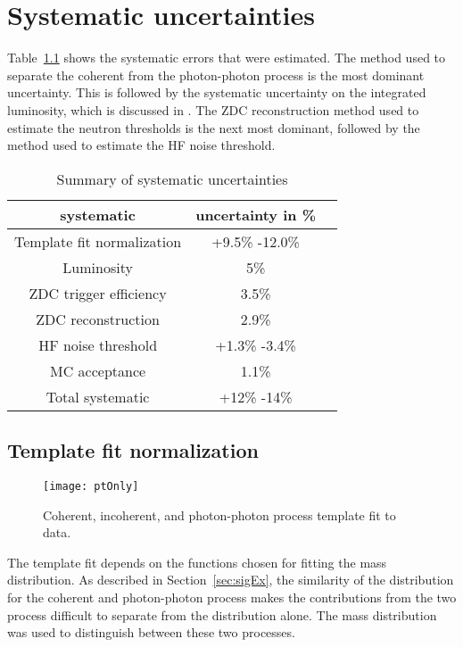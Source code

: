 \chapter{\label{sec:sysCheck}Systematic uncertainties}
  
  Table~\ref{tab:sumsyst} shows the systematic errors that were estimated.
  The method used to separate the coherent from the photon-photon process 
   is the most dominant uncertainty.
  This is followed by the systematic uncertainty on the integrated luminosity,
    which is discussed in \cite{cmsLumi}.
  The ZDC reconstruction method used to estimate the neutron thresholds 
    is the next most dominant, followed by the method used to estimate
    the HF noise threshold. 
  \begin{table}[!Hhtb]
    \begin{center}
      \begin{tabular}{|c|c|c|}
        \hline
        systematic & uncertainty in \%  \\ \hline
        Template fit normalization & +9.5\% -12.0\% \\ \hline
        Luminosity & 5\% \\ \hline
        ZDC trigger efficiency & 3.5\%    \\ \hline
        ZDC reconstruction  & 2.9\%  \\ \hline
        HF noise threshold & +1.3\% -3.4\% \\ \hline 
        MC acceptance & 1.1\% \\ \hline
        \hline \hline
        Total systematic & +12\% -14\% \\ \hline
      \end{tabular}
      \caption{Summary of systematic uncertainties}
      \label{tab:sumsyst}
    \end{center}
  \end{table}

  \section{Template fit normalization}
    \begin{figure}[!Hhtb]
      \centering
      \texttt{[image: ptOnly]}
      \caption{Coherent, incoherent, and photon-photon process \pt{} template fit to data.}
      \label{fig:ptTempFit}
    \end{figure}
   
    The \pt{} template fit depends on the functions chosen for fitting
      the mass distribution.
    As described in Section~\ref{sec:sigEx}, the similarity of the 
      \pt{} distribution for the coherent and photon-photon process makes
      the contributions from the two process difficult to separate from the 
      \pt{} distribution alone.
    The mass distribution was used to distinguish between these two processes.

